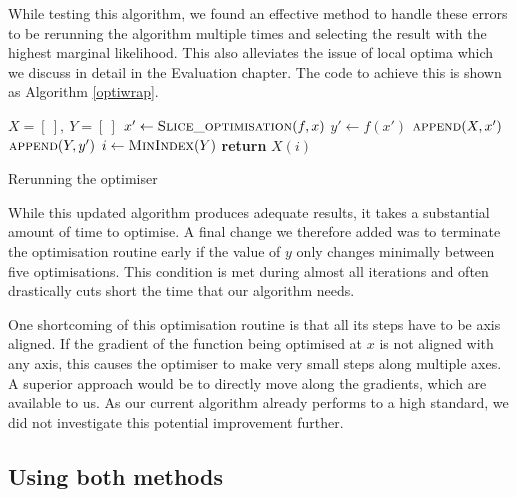 \documentclass[a4paper,12pt,twoside,openright]{report}
\begin{document}
While testing this algorithm, we found an effective method to handle these errors to be rerunning the algorithm multiple times and selecting the result with the highest marginal likelihood. This also alleviates the issue of local optima which we discuss in detail in the Evaluation chapter. The code to achieve this is shown as Algorithm \ref{optiwrap}.

\begin{algorithm}
\begin{algorithmic}[1]
\State $X = [\ ],\ Y = [\ ]$
\State $x'\gets \Call{Slice\_optimisation}{f, x}$
\State $y'\gets f(x')$
\State $\Call{append}{X, x'}$
\State $\Call{append}{Y, y'}$
\EndFor
\State $i\gets \Call{MinIndex}{Y}$
\State \textbf{return} $X(i)$
\EndProcedure
\end{algorithmic}
\caption{Rerunning the optimiser}
\label{optiwrap}
\end{algorithm}

While this updated algorithm produces adequate results, it takes a substantial amount of time to optimise. A final change we therefore added was to terminate the optimisation routine early if the value of $y$ only changes minimally between five optimisations. This condition is met during almost all iterations and often drastically cuts short the time that our algorithm needs.

One shortcoming of this optimisation routine is that all its steps have to be axis aligned. If the gradient of the function being optimised at $x$ is not aligned with any axis, this causes the optimiser to make very small steps along multiple axes. A superior approach would be to directly move along the gradients, which are available to us. As our current algorithm already performs to a high standard, we did not investigate this potential improvement further.





\subsection{Using both methods} %
\end{document}
